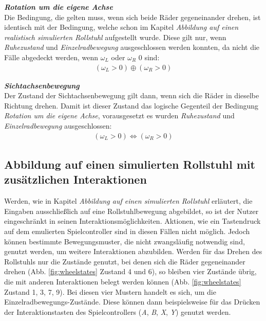 \textbf{\textit{Rotation um die eigene Achse}}\\
Die Bedingung, die gelten muss, wenn sich beide Räder gegeneinander drehen, ist identisch mit der Bedingung, welche schon im Kapitel \textit{Abbildung auf einen realistisch simulierten Rollstuhl} aufgestellt wurde.
Diese gilt nur, wenn \textit{Ruhezustand} und \textit{Einzelradbewegung} ausgeschlossen werden konnten, da nicht die Fälle abgedeckt werden, wenn $\omega_L$ oder $\omega_R$ 0 sind:
\begin{align}
    (\omega_L > 0) \oplus (\omega_R > 0)
\end{align}

\textbf{\textit{Sichtachsenbewegung}}\\
Der Zustand der Sichtachsenbewegung gilt dann, wenn sich die Räder in dieselbe Richtung drehen.
Damit ist dieser Zustand das logische Gegenteil der Bedingung \textit{Rotation um die eigene Achse}, vorausgesetzt es wurden \textit{Ruhezustand} und \textit{Einzelradbewegung} ausgeschlossen:
\begin{align}
    (\omega_L > 0) \Leftrightarrow (\omega_R > 0)
\end{align}

\subsection{Abbildung auf einen simulierten Rollstuhl mit zusätzlichen Interaktionen}
Werden, wie in Kapitel \textit{Abbildung auf einen simulierten Rollstuhl} erläutert, die Eingaben ausschließlich auf eine Rollstuhlbewegung abgebildet, so ist der Nutzer eingeschränkt in seinen Interaktionsmöglichkeiten.
Aktionen, wie ein Tastendruck auf dem emulierten Spielcontroller sind in diesen Fällen nicht möglich.
Jedoch können bestimmte Bewegungsmuster, die nicht zwangsläufig notwendig sind, genutzt werden, um weitere Interaktionen abzubilden.
Werden für das Drehen des Rollstuhls nur die Zustände genutzt, bei denen sich die Räder gegeneinander drehen (Abb. \ref{fig:wheelstates} Zustand 4 und 6), so bleiben vier Zustände übrig, die mit anderen Interaktionen belegt werden können (Abb. \ref{fig:wheelstates} Zustand 1, 3, 7, 9).
Bei diesen vier Mustern handelt es sich, um die Einzelradbewegungs-Zustände.
Diese können dann beispielsweise für das Drücken der Interaktionstasten des Spielcontrollers (\textit{A}, \textit{B}, \textit{X}, \textit{Y}) genutzt werden.

